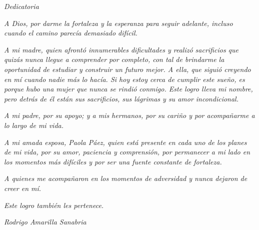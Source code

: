 



\clearpage
\thispagestyle{plain}

\begin{center}
{\Large\textit{Dedicatoria}}
\end{center}

\vspace{1em}

\begingroup
\small
\setlength{\parindent}{0pt}
\setlength{\parskip}{0.6em}

\begin{flushright}

\textit{A Dios, por darme la fortaleza y la esperanza
para seguir adelante, incluso cuando el camino
parecía demasiado difícil.}


\textit{A mi madre, quien afrontó innumerables dificultades
y realizó sacrificios que quizás nunca llegue a comprender
por completo, con tal de brindarme la oportunidad de
estudiar y construir un futuro mejor. A ella, que siguió
creyendo en mí cuando nadie más lo hacía. Si hoy estoy
cerca de cumplir este sueño, es porque hubo una mujer
que nunca se rindió conmigo. Este logro lleva mi nombre,
pero detrás de él están sus sacrificios, sus lágrimas
y su amor incondicional.}


\textit{A mi padre, por su apoyo; y a mis hermanos,
por su cariño y por acompañarme a lo largo de mi vida.}


\textit{A mi amada esposa, Paola Páez, quien está presente
en cada uno de los planes de mi vida, por su amor,
paciencia y comprensión, por permanecer a mi lado
en los momentos más difíciles y por ser una fuente
constante de fortaleza.}


\textit{A quienes me acompañaron en los momentos
de adversidad y nunca dejaron de creer en mí.}

\textit{Este logro también les pertenece.}

\vspace{0.8em}

\textit{Rodrigo Amarilla Sanabria}

\end{flushright}
\endgroup

\clearpage
